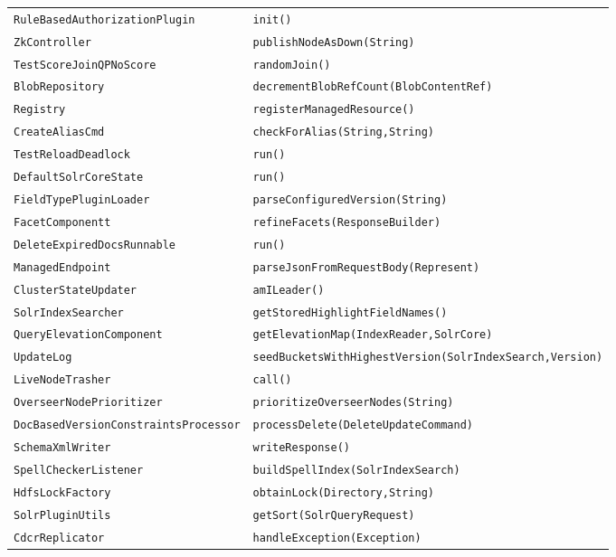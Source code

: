 \begin{center}
\begin{longtable}{ll}
 \lstinline/RuleBasedAuthorizationPlugin/&{\lstinline/init()/}\\
 \lstinline/ZkController/&{\lstinline/publishNodeAsDown(String)/}\\
 \lstinline/TestScoreJoinQPNoScore/&{\lstinline/randomJoin()/}\\
 \lstinline/BlobRepository/&{\lstinline/decrementBlobRefCount(BlobContentRef)/}\\
 \lstinline/Registry/&{\lstinline/registerManagedResource()/}\\
 \lstinline/CreateAliasCmd/&{\lstinline/checkForAlias(String,String)/}\\
 \lstinline/TestReloadDeadlock/&{\lstinline/run()/}\\
 \lstinline/DefaultSolrCoreState/&{\lstinline/run()/}\\
 \lstinline/FieldTypePluginLoader/&{\lstinline/parseConfiguredVersion(String)/}\\
 \lstinline/FacetComponentt/&{\lstinline/refineFacets(ResponseBuilder)/}\\
 \lstinline/DeleteExpiredDocsRunnable/&{\lstinline/run()/}\\
 \lstinline/ManagedEndpoint/&{\lstinline/parseJsonFromRequestBody(Represent)/}\\
 \lstinline/ClusterStateUpdater/&{\lstinline/amILeader()/}\\
 \lstinline/SolrIndexSearcher/&{\lstinline/getStoredHighlightFieldNames()/}\\
 \lstinline/QueryElevationComponent/&{\lstinline/getElevationMap(IndexReader,SolrCore)/}\\
 \lstinline/UpdateLog/&{\lstinline/seedBucketsWithHighestVersion(SolrIndexSearch,Version)/}\\
 \lstinline/LiveNodeTrasher/&{\lstinline/call()/}\\
 \lstinline/OverseerNodePrioritizer/&{\lstinline/prioritizeOverseerNodes(String)/}\\
 \lstinline/DocBasedVersionConstraintsProcessor/&{\lstinline/processDelete(DeleteUpdateCommand)/}\\
 \lstinline/SchemaXmlWriter/&{\lstinline/writeResponse()/}\\
 \lstinline/SpellCheckerListener/&{\lstinline/buildSpellIndex(SolrIndexSearch)/}\\
 \lstinline/HdfsLockFactory/&{\lstinline/obtainLock(Directory,String)/}\\
 \lstinline/SolrPluginUtils/&{\lstinline/getSort(SolrQueryRequest)/}\\
 \lstinline/CdcrReplicator/&{\lstinline/handleException(Exception)/}\\

\end{longtable}
\end{center}
